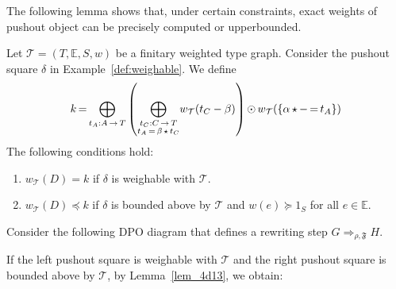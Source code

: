 The following lemma shows that, under certain constraints, exact weights of pushout object can be precisely computed or upperbounded.
\begin{lemma}
    \label{lem_4d13}
    Let $\mathcal{T} \mathop{=} (T,\mathbb{E}, S, w)$ be a finitary weighted type graph. Consider the pushout square $\delta$ in Example~\ref{def:weighable}.
  We define
     \[k \mathop{=} \underset{t_A:A \mathop{\rightarrow} T}{\mathop{\bigoplus}}
            \left ( 
                \underset{\substack{t_C:C \mathop{\rightarrow} T\\
                                            t_A \mathop{=} \beta \mathop{\star} t_C }}{\mathop{\bigoplus}}
                        w_\mathcal{T}(t_C - \beta)     
                 \right ) 
            \mathop{\odot} 
                w_\mathcal{T}(\{\alpha \mathop{\star} - \mathop{=} t_A\})
    \]
    The following conditions hold:
    \begin{enumerate}[label=(\Alph*)]
        \item  $w_\mathcal{T}(D)=k$ if $\delta$ is weighable with $\mathcal{T}$.
        \item  $w_\mathcal{T}(D)\mathop{\preceq} k$ if $\delta$ is bounded above by $\mathcal{T}$  and \(w(e) \mathop{\succeq} 1_S\) for all $e \mathop{\in} \mathbb{E}$.
    \end{enumerate}
\end{lemma}

    Consider the following DPO diagram
     that defines a rewriting step \( G \mathop{\Rightarrow}_{\rho,\mathfrak{F}} H \).  
    \begin{center}  
    \end{center}
    If the left pushout square is weighable with $\mathcal{T}$ and the right pushout square is bounded above by $\mathcal{T}$, by Lemma~\ref{lem_4d13}, we obtain:

